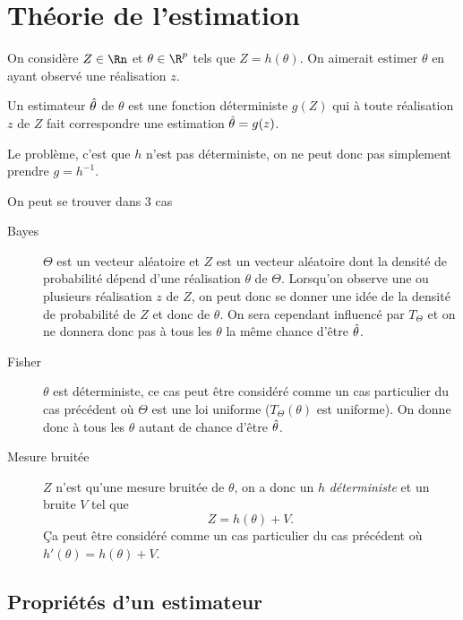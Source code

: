 \section{Théorie de l'estimation}
On considère $Z \in \Rn$ et $\theta \in \R^p$ tels que $Z = h(\theta)$.
On aimerait estimer $\theta$ en ayant observé une réalisation $z$.
\begin{mydef}[Estimateur]
  Un estimateur $\hat{\theta}$ de $\theta$ est une fonction déterministe $g(Z)$ qui
  à toute réalisation $z$ de $Z$ fait correspondre une estimation $\hat{\theta}=g(z)$.
\end{mydef}
Le problème, c'est que $h$ n'est pas déterministe,
on ne peut donc pas simplement prendre $g = h^{-1}$.

On peut se trouver dans 3 cas
\begin{description}
  \item[Bayes] $\Theta$ est un vecteur aléatoire et $Z$ est un vecteur aléatoire
    dont la densité de probabilité dépend d'une réalisation $\theta$
    de $\Theta$.
    Lorsqu'on observe une ou plusieurs réalisation $z$ de $Z$, on peut donc
    se donner une idée de la densité de probabilité de $Z$ et donc de $\theta$.
    On sera cependant influencé par $T_\Theta$ et on ne donnera donc pas à
    tous les $\theta$ la même chance d'être $\hat{\theta}$.
  \item[Fisher] $\theta$ est déterministe, ce cas peut être considéré comme un cas
    particulier du cas précédent où $\Theta$ est une loi uniforme
    ($T_\Theta(\theta)$ est uniforme).
    On donne donc à tous les $\theta$ autant de chance d'être $\hat{\theta}$.
  \item[Mesure bruitée] $Z$ n'est qu'une mesure bruitée de $\theta$, on a donc
    un $h$ \emph{déterministe} et un bruite $V$ tel que
    \[ Z = h(\theta) + V. \]
    Ça peut être considéré comme un cas particulier du cas précédent
    où $h'(\theta) = h(\theta) + V$.
\end{description}

\subsection{Propriétés d'un estimateur}

